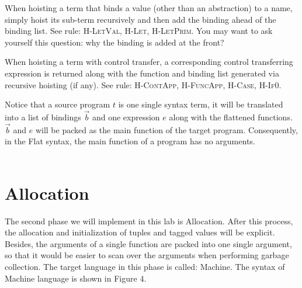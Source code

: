 \documentclass{article}
\theoremstyle{definition}
\theoremstyle{remark}
\numberwithin{equation}{section}
\begin{document}
When hoisting a term that binds a value (other than an abstraction) to a name,
simply hoist its sub-term recursively and then add the binding ahead of the binding
list. See rule: \textsc{H-LetVal, H-Let, H-LetPrim}. You may want to ask yourself
 this question: why the binding is added at the front?

When hoisting a term with control transfer, a corresponding control transferring
expression is returned along with the function and binding list generated via recursive
hoisting (if any). See rule: \textsc{H-ContApp, H-FuncApp, H-Case, H-If0}.

Notice that a source program $t$ is one single syntax term, it will be translated
into a list of bindings $\vec{b}$ and one expression $e$ along with the flattened
functions.  $\vec{b}$ and $e$ will be packed as the main function of the target
program. Consequently, in the Flat syntax, the main function of a program has no arguments.\\

$\ $\\


\section{Allocation}

The second phase we will implement in this lab is Allocation. After this
 process, the allocation and initialization of tuples and tagged values will
be explicit. Besides, the arguments of a single function are packed into
one single argument, so that it would be easier to scan over the arguments
 when performing garbage collection. The target language in this phase is called:
 Machine. The syntax of Machine language is shown in Figure 4.
\end{document}
